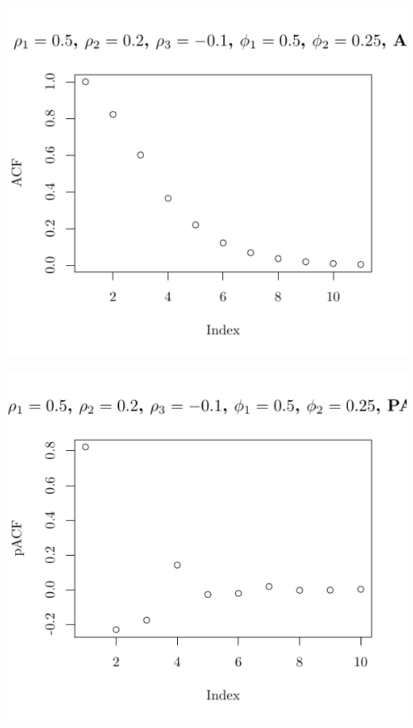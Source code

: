 \documentclass[10pt]{paper}\usepackage[]{graphicx}\usepackage[]{color}
\makeatletter
\def\maxwidth{ %
  \ifdim\Gin@nat@width>\linewidth
    \linewidth
  \else
    \Gin@nat@width
  \fi
}
\newenvironment{knitrout}{}{} %
\makeatother
\begin{document}
\begin{knitrout}
{\centering \includegraphics[width=\maxwidth]{figure/graphics-plotter-199} 

}




{\centering \includegraphics[width=\maxwidth]{figure/graphics-plotter-200} 

}





\end{knitrout}
\end{document}
